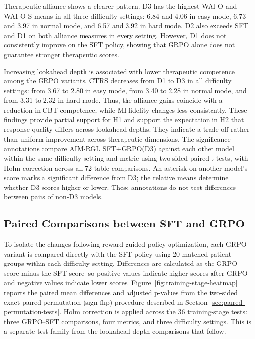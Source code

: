Therapeutic alliance shows a clearer pattern. D3 has the highest WAI-O and WAI-O-S means in all three difficulty settings: 6.84 and 4.06 in easy mode, 6.73 and 3.97 in normal mode, and 6.57 and 3.92 in hard mode. D2 also exceeds SFT and D1 on both alliance measures in every setting. However, D1 does not consistently improve on the SFT policy, showing that GRPO alone does not guarantee stronger therapeutic scores.

Increasing lookahead depth is associated with lower therapeutic competence among the GRPO variants. CTRS decreases from D1 to D3 in all difficulty settings: from 3.67 to 2.80 in easy mode, from 3.40 to 2.28 in normal mode, and from 3.31 to 2.32 in hard mode. Thus, the alliance gains coincide with a reduction in CBT competence, while MI fidelity changes less consistently. These findings provide partial support for H1 and support the expectation in H2 that response quality differs across lookahead depths. They indicate a trade-off rather than uniform improvement across therapeutic dimensions. The significance annotations compare AIM-RGL SFT+GRPO(D3) against each other model within the same difficulty setting and metric using two-sided paired t-tests, with Holm correction across all 72 table comparisons. An asterisk on another model's score marks a significant difference from D3; the relative means determine whether D3 scores higher or lower. These annotations do not test differences between pairs of non-D3 models.

\subsection{Paired Comparisons between SFT and GRPO}

To isolate the changes following reward-guided policy optimization, each GRPO variant is compared directly with the SFT policy using 20 matched patient groups within each difficulty setting. Differences are calculated as the GRPO score minus the SFT score, so positive values indicate higher scores after GRPO and negative values indicate lower scores. Figure~\ref{fig:training-stage-heatmap} reports the paired mean differences and adjusted p-values from the two-sided exact paired permutation (sign-flip) procedure described in Section~\ref{sec:paired-permutation-tests}. Holm correction is applied across the 36 training-stage tests: three GRPO--SFT comparisons, four metrics, and three difficulty settings. This is a separate test family from the lookahead-depth comparisons that follow.

